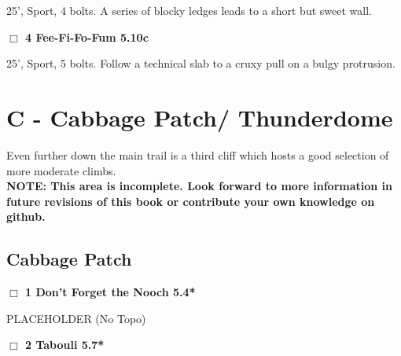 \begin{multicols}{2}
\begin{adjustwidth}{1.3em}{}
25', Sport, 4 bolts. A series of blocky ledges leads to a short but sweet wall.
\end{adjustwidth}




\needspace{2em}
\label{rt:Fee-Fi-Fo-Fum}
\colorbox{RoyalBlue!20}{
\parbox{0.95\linewidth}{
\hspace{-1ex}\textbf{$\Box$
4 Fee-Fi-Fo-Fum 5.10c  
}}}
\begin{adjustwidth}{1.3em}{}			

25', Sport, 5 bolts. Follow a technical slab to a cruxy pull on a bulgy protrusion.
\end{adjustwidth}





\null\newpage

\section{C - Cabbage Patch/ Thunderdome}\label{sa:Cabbage Patch/ Thunderdome}

Even further down the main trail is a third cliff which hosts a good selection of more moderate climbs.\\
\textbf{NOTE: This area is incomplete. Look forward to more information in future revisions of this book or contribute your own knowledge on github.}\\




\needspace{10em}
\subsection*{Cabbage Patch}\label{bf:Cabbage Patch}




\needspace{2em}
\label{rt:Don't Forget the Nooch}
\colorbox{green!20}{
\parbox{0.95\linewidth}{
\hspace{-1ex}\textbf{$\Box$
1 Don't Forget the Nooch 5.4*  
}}}
\begin{adjustwidth}{1.3em}{}			

PLACEHOLDER
  (No Topo)
\end{adjustwidth}




\needspace{2em}
\label{rt:Tabouli}
\colorbox{green!20}{
\parbox{0.95\linewidth}{
\hspace{-1ex}\textbf{$\Box$
2 Tabouli 5.7*  
}}}
\begin{adjustwidth}{1.3em}{}			


\end{adjustwidth}
\end{multicols}
